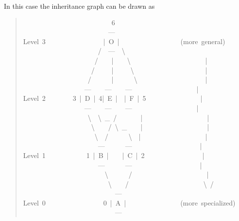 \documentclass[10pt,english]{article}
\begin{document}
In this case the inheritance graph can be drawn as
\begin{quote}
\begin{ttfamily}\begin{flushleft}
\mbox{~~~~~~~~~~~~~~~~~~~~~~~~~~6}\\
\mbox{~~~~~~~~~~~~~~~~~~~~~~~~~---}\\
\mbox{Level~3~~~~~~~~~~~~~~~~~|~O~|~~~~~~~~~~~~~~~~~~(more~general)}\\
\mbox{~~~~~~~~~~~~~~~~~~~~~~/~~---~~{\textbackslash}}\\
\mbox{~~~~~~~~~~~~~~~~~~~~~/~~~~|~~~~{\textbackslash}~~~~~~~~~~~~~~~~~~~~~~|}\\
\mbox{~~~~~~~~~~~~~~~~~~~~/~~~~~|~~~~~{\textbackslash}~~~~~~~~~~~~~~~~~~~~~|}\\
\mbox{~~~~~~~~~~~~~~~~~~~/~~~~~~|~~~~~~{\textbackslash}~~~~~~~~~~~~~~~~~~~~|}\\
\mbox{~~~~~~~~~~~~~~~~~~---~~~~---~~~~---~~~~~~~~~~~~~~~~~~~|}\\
\mbox{Level~2~~~~~~~~3~|~D~|~4|~E~|~~|~F~|~5~~~~~~~~~~~~~~~~|}\\
\mbox{~~~~~~~~~~~~~~~~~~---~~~~---~~~~---~~~~~~~~~~~~~~~~~~~|}\\
\mbox{~~~~~~~~~~~~~~~~~~~{\textbackslash}~~{\textbackslash}~{\_}~/~~~~~~~|~~~~~~~~~~~~~~~~~~~|}\\
\mbox{~~~~~~~~~~~~~~~~~~~~{\textbackslash}~~~~/~{\textbackslash}~{\_}~~~~|~~~~~~~~~~~~~~~~~~~|}\\
\mbox{~~~~~~~~~~~~~~~~~~~~~{\textbackslash}~~/~~~~~~{\textbackslash}~~|~~~~~~~~~~~~~~~~~~~|}\\
\mbox{~~~~~~~~~~~~~~~~~~~~~~---~~~~~~---~~~~~~~~~~~~~~~~~~~~|}\\
\mbox{Level~1~~~~~~~~~~~~1~|~B~|~~~~|~C~|~2~~~~~~~~~~~~~~~~~|}\\
\mbox{~~~~~~~~~~~~~~~~~~~~~~---~~~~~~---~~~~~~~~~~~~~~~~~~~~|}\\
\mbox{~~~~~~~~~~~~~~~~~~~~~~~~{\textbackslash}~~~~~~/~~~~~~~~~~~~~~~~~~~~~~|}\\
\mbox{~~~~~~~~~~~~~~~~~~~~~~~~~{\textbackslash}~~~~/~~~~~~~~~~~~~~~~~~~~~~{\textbackslash}~/}\\
\mbox{~~~~~~~~~~~~~~~~~~~~~~~~~~~---}\\
\mbox{Level~0~~~~~~~~~~~~~~~~~0~|~A~|~~~~~~~~~~~~~~~~(more~specialized)}\\
\mbox{~~~~~~~~~~~~~~~~~~~~~~~~~~~---}
\end{flushleft}\end{ttfamily}
\end{quote}
\end{document}

